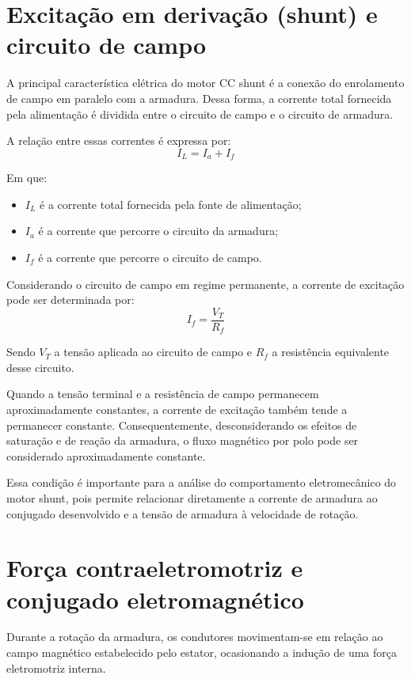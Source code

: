 \documentclass[12pt,openright,oneside,a4paper,brazilian]{abntex2}
\begin{document}
\section{Excitação em derivação (shunt) e circuito de campo}
A principal característica elétrica do motor CC shunt é a conexão do enrolamento de campo em paralelo com a armadura. Dessa forma, a corrente total fornecida pela alimentação é dividida entre o circuito de campo e o circuito de armadura.

A relação entre essas correntes é expressa por:
\begin{equation}
I_L = I_a + I_f
\label{corrente_total}
\end{equation}

Em que:
\begin{itemize}
    \item $I_L$ é a corrente total fornecida pela fonte de alimentação;
    \item $I_a$ é a corrente que percorre o circuito da armadura;
    \item $I_f$ é a corrente que percorre o circuito de campo.
\end{itemize}

Considerando o circuito de campo em regime permanente, a corrente de excitação pode ser determinada por:
\begin{equation}
I_f = \frac{V_T}{R_f}
\label{corrente_campo}
\end{equation}  

Sendo $V_T$ a tensão aplicada ao circuito de campo e $R_f$ a resistência equivalente desse circuito.

Quando a tensão terminal e a resistência de campo permanecem aproximadamente constantes, a corrente de excitação também tende a permanecer constante. Consequentemente, desconsiderando os efeitos de saturação e de reação da armadura, o fluxo magnético por polo pode ser considerado aproximadamente constante.

Essa condição é importante para a análise do comportamento eletromecânico do motor shunt, pois permite relacionar diretamente a corrente de armadura ao conjugado desenvolvido e a tensão de armadura à velocidade de rotação.

\section{Força contraeletromotriz e conjugado eletromagnético}
Durante a rotação da armadura, os condutores movimentam-se em relação ao campo magnético estabelecido pelo estator, ocasionando a indução de uma força eletromotriz interna.
\end{document}
